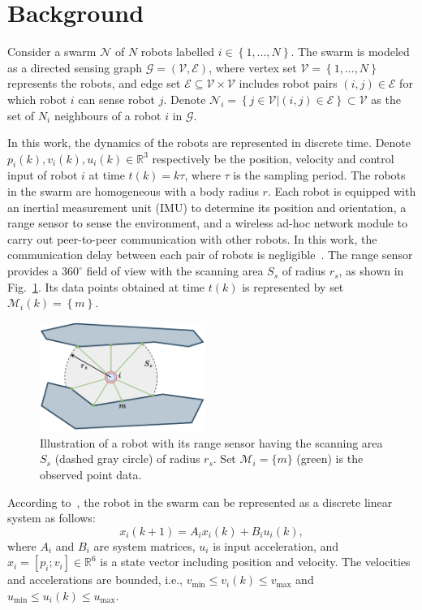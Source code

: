 \section{Background}\label{sec:problem}
Consider a swarm $\mathcal{N}$ of $N$ robots labelled $i\in\left\{1,...,N\right\}$. The swarm is modeled as a directed sensing graph $\mathcal{G}=\left(\mathcal{V},\mathcal{E}\right)$, where vertex set $\mathcal{V} = \left\{1,..., N\right\}$ represents the robots, and edge set $\mathcal{E}\subseteq\mathcal{V}\times \mathcal{V}$ includes robot pairs $\left(i, j\right)\in\mathcal{E}$ for which robot $i$ can sense robot $j$. Denote $\mathcal{N}_i=\left\{j\in\mathcal{V}|\left(i,j\right)\in\mathcal{E}\right\}\subset\mathcal{V}$ as the set of $N_i$ neighbours of a robot $i$ in $\mathcal{G}$.

In this work, the dynamics of the robots are represented in discrete time. Denote $p_i(k),v_i(k),u_i(k)\in\mathbb{R}^3$ respectively be the position, velocity and control input of robot $i$ at time $t(k) = k\tau$, where $\tau$ is the sampling period. The robots in the swarm are homogeneous with a body radius $r$. Each robot is equipped with an inertial measurement unit (IMU) to determine its position and orientation, a range sensor to sense the environment, and a wireless ad-hoc network module to carry out peer-to-peer communication with other robots. In this work, the communication delay between each pair of robots is negligible~\cite{AlonsoMora2018,9527169}. The range sensor provides a $360^\circ$ field of view with the scanning area $S_s$ of radius $r_s$, as shown in Fig.~\ref{fig:model}. Its data points obtained at time $t(k)$ is represented by set $\mathcal{M}_i(k)=\left\{m\right\}$.
\begin{figure}
    \centering
    \includegraphics[width=0.48\textwidth]{paper3/images/model.pdf}
    \caption{Illustration of a robot with its range sensor having the scanning area $S_s$ (dashed gray circle) of radius $r_s$. Set $\mathcal{M}_i=\{m\}$ (green) is the observed point data.}
    \label{fig:model}
\end{figure}

According to~\cite{Soria2021}, the robot in the swarm can be represented as a discrete linear system as follows:
\begin{equation}
    x_i(k+1)=A_ix_i(k) + B_iu_i(k),
\end{equation}
where $A_i$ and $B_i$ are system matrices, $u_i$ is input acceleration, and $x_i=\left[p_i;v_i\right]\in\mathbb{R}^6$ is a state vector including position and velocity. The velocities and accelerations are bounded, i.e., $v_\text{min}\leq v_i(k)\leq v_\text{max}$ and $u_\text{min}\leq u_i(k)\leq u_\text{max}$.